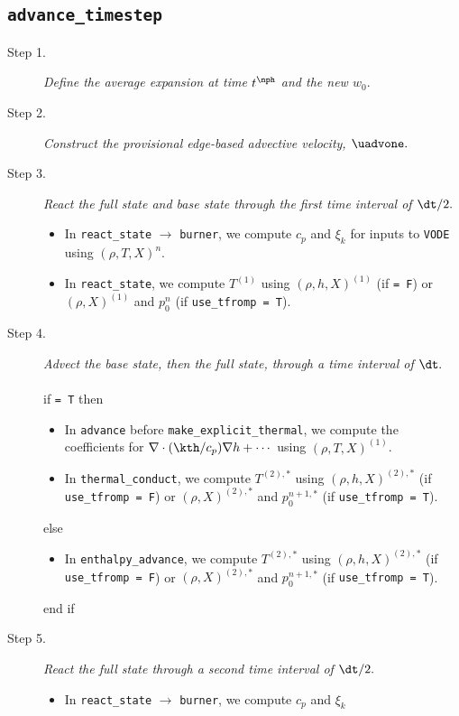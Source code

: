 \subsection{{\tt advance\_timestep}}
\begin{description}
\item[Step 1.] {\em Define the average expansion at time $t^\nph$ and the new $w_0.$}
\item[Step 2.] {\em Construct the provisional edge-based advective velocity, $\uadvone.$}
\item[Step 3.] {\em React the full state and base state through the first time interval 
of $\dt/2.$}
\begin{itemize}
\item In {\tt react\_state} $\rightarrow$ {\tt burner}, we compute $c_p$ and $\xi_k$ 
for inputs to {\tt VODE} using $(\rho,T,X)^n$.
\item In {\tt react\_state}, we compute $T^{(1)}$ using $(\rho,h,X)^{(1)}$ 
(if  {\tt = F}) or $(\rho,X)^{(1)}$ and $p_0^n$ (if {\tt use\_tfromp = T}).
\end{itemize}
\item[Step 4.] {\em Advect the base state, then the full state, through a time interval 
of $\dt.$}\\ \\
if  {\tt = T} then
\begin{itemize}
\item In {\tt advance} before {\tt make\_explicit\_thermal}, we compute the coefficients for 
$\nabla\cdot(\kth/c_p)\nabla h + \cdots$ using $(\rho,T,X)^{(1)}$.
\item In {\tt thermal\_conduct}, we compute $T^{(2),*}$ using $(\rho,h,X)^{(2),*}$
(if {\tt use\_tfromp = F}) or $(\rho,X)^{(2),*}$ and $p_0^{n+1,*}$ (if {\tt use\_tfromp = T}).
\end{itemize}
else
\begin{itemize}
\item In {\tt enthalpy\_advance}, we compute $T^{(2),*}$ using $(\rho,h,X)^{(2),*}$
(if {\tt use\_tfromp = F}) or $(\rho,X)^{(2),*}$ and $p_0^{n+1,*}$ (if {\tt use\_tfromp = T}).
\end{itemize}
end if
\item[Step 5.] {\em React the full state through a second time interval of $\dt/2.$}
\begin{itemize}
\item In {\tt react\_state} $\rightarrow$ {\tt burner}, we compute $c_p$ and $\xi_k$ 

\end{itemize}
\end{description}
